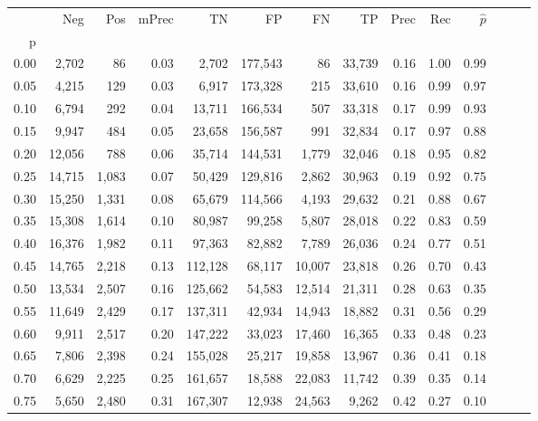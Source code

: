 \begin{tabular}{rrrrrrrrrrrrrr}
\toprule
{} &     Neg &    Pos & mPrec &       TN &       FP &      FN &      TP &  Prec &   Rec & $\hat{p}$ \\
p    &         &        &       &          &          &         &         &       &       &           \\
\midrule
0.00 &   2,702 &     86 &  0.03 &    2,702 &  177,543 &      86 &  33,739 &  0.16 &  1.00 &      0.99 \\
0.05 &   4,215 &    129 &  0.03 &    6,917 &  173,328 &     215 &  33,610 &  0.16 &  0.99 &      0.97 \\
0.10 &   6,794 &    292 &  0.04 &   13,711 &  166,534 &     507 &  33,318 &  0.17 &  0.99 &      0.93 \\
0.15 &   9,947 &    484 &  0.05 &   23,658 &  156,587 &     991 &  32,834 &  0.17 &  0.97 &      0.88 \\
0.20 &  12,056 &    788 &  0.06 &   35,714 &  144,531 &   1,779 &  32,046 &  0.18 &  0.95 &      0.82 \\
0.25 &  14,715 &  1,083 &  0.07 &   50,429 &  129,816 &   2,862 &  30,963 &  0.19 &  0.92 &      0.75 \\
0.30 &  15,250 &  1,331 &  0.08 &   65,679 &  114,566 &   4,193 &  29,632 &  0.21 &  0.88 &      0.67 \\
0.35 &  15,308 &  1,614 &  0.10 &   80,987 &   99,258 &   5,807 &  28,018 &  0.22 &  0.83 &      0.59 \\
0.40 &  16,376 &  1,982 &  0.11 &   97,363 &   82,882 &   7,789 &  26,036 &  0.24 &  0.77 &      0.51 \\
0.45 &  14,765 &  2,218 &  0.13 &  112,128 &   68,117 &  10,007 &  23,818 &  0.26 &  0.70 &      0.43 \\
0.50 &  13,534 &  2,507 &  0.16 &  125,662 &   54,583 &  12,514 &  21,311 &  0.28 &  0.63 &      0.35 \\
0.55 &  11,649 &  2,429 &  0.17 &  137,311 &   42,934 &  14,943 &  18,882 &  0.31 &  0.56 &      0.29 \\
0.60 &   9,911 &  2,517 &  0.20 &  147,222 &   33,023 &  17,460 &  16,365 &  0.33 &  0.48 &      0.23 \\
0.65 &   7,806 &  2,398 &  0.24 &  155,028 &   25,217 &  19,858 &  13,967 &  0.36 &  0.41 &      0.18 \\
0.70 &   6,629 &  2,225 &  0.25 &  161,657 &   18,588 &  22,083 &  11,742 &  0.39 &  0.35 &      0.14 \\
0.75 &   5,650 &  2,480 &  0.31 &  167,307 &   12,938 &  24,563 &   9,262 &  0.42 &  0.27 &      0.10 \\

\end{tabular}
